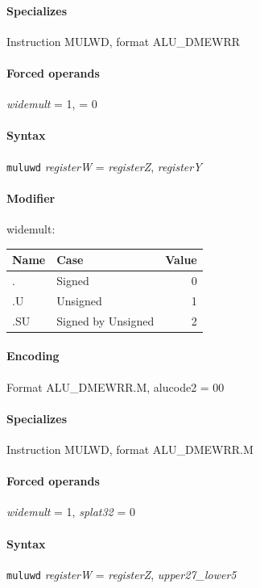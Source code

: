 {\paragraph{Specializes} Instruction MULWD, format ALU\_DMEWRR

\paragraph{Forced operands} \emph{widemult} = 1, \emph{} = 0

\paragraph{Syntax} \texttt{muluwd} \emph{registerW} = \emph{registerZ}, \emph{registerY}

\paragraph{Modifier} \textsf{widemult}:\\

\noindent \begin{tabular}{|l|l|r|} \hline
\bf{Name} & \bf{Case} & \bf{Value} \\ \hline
. & Signed & 0 \\
.U & Unsigned & 1 \\
.SU & Signed by Unsigned & 2 \\
\hline \end{tabular}

\paragraph{Encoding} Format \textsf{ALU\_DMEWRR.M, alucode2 = 00}\\



\paragraph{Specializes} Instruction MULWD, format ALU\_DMEWRR.M

\paragraph{Forced operands} \emph{widemult} = 1, \emph{splat32} = 0

\paragraph{Syntax} \texttt{muluwd} \emph{registerW} = \emph{registerZ}, \emph{upper27\_lower5}

}
